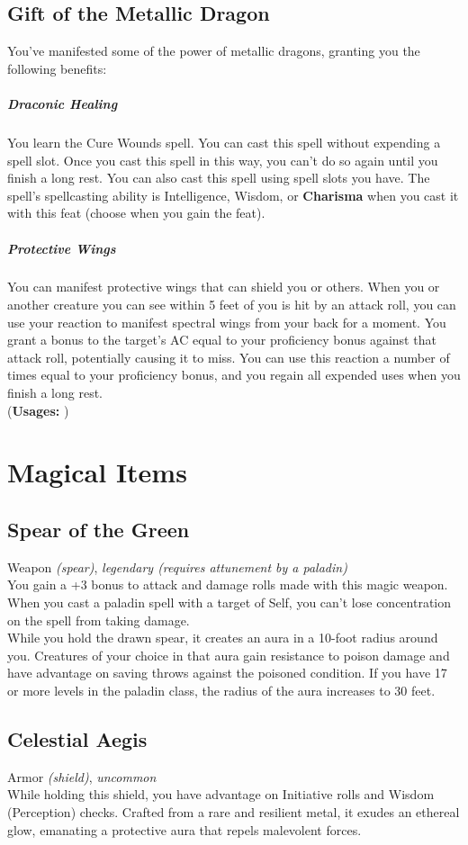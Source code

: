 \documentclass[letterpaper,openany,oneside,twocolumn]{book}
\begin{document}
\subsection*{Gift of the Metallic Dragon}
You've manifested some of the power of metallic dragons, granting you the following benefits:
\subparagraph*{Draconic Healing}
You learn the Cure Wounds spell. You can cast this spell without expending a spell slot. Once you cast this spell in this way, you can't do so again until you finish a long rest. You can also cast this spell using spell slots you have. The spell's spellcasting ability is Intelligence, Wisdom, or \textbf{Charisma} when you cast it with this feat (choose when you gain the feat).
\subparagraph*{Protective Wings}
You can manifest protective wings that can shield you or others. When you or another creature you can see within 5 feet of you is hit by an attack roll, you can use your reaction to manifest spectral wings from your back for a moment. You grant a bonus to the target's AC equal to your proficiency bonus against that attack roll, potentially causing it to miss. You can use this reaction a number of times equal to your proficiency bonus, and you regain all expended uses when you finish a long rest.\\
(\textbf{Usages: })

\section*{Magical Items}
\subsection*{Spear of the Green}
Weapon \textit{(spear)}, \textit{legendary (requires attunement by a paladin)}\\
You gain a +3 bonus to attack and damage rolls made with this magic weapon. When you cast a paladin spell with a target of Self, you can't lose concentration on the spell from taking damage.\\
While you hold the drawn spear, it creates an aura in a 10-foot radius around you. Creatures of your choice in that aura gain resistance to poison damage and have advantage on saving throws against the poisoned condition. If you have 17 or more levels in the paladin class, the radius of the aura increases to 30 feet.
\subsection*{Celestial Aegis}
Armor \textit{(shield)}, \textit{uncommon}\\
While holding this shield, you have advantage on Initiative rolls and Wisdom (Perception) checks. Crafted from a rare and resilient metal, it exudes an ethereal glow, emanating a protective aura that repels malevolent forces.
\end{document}
